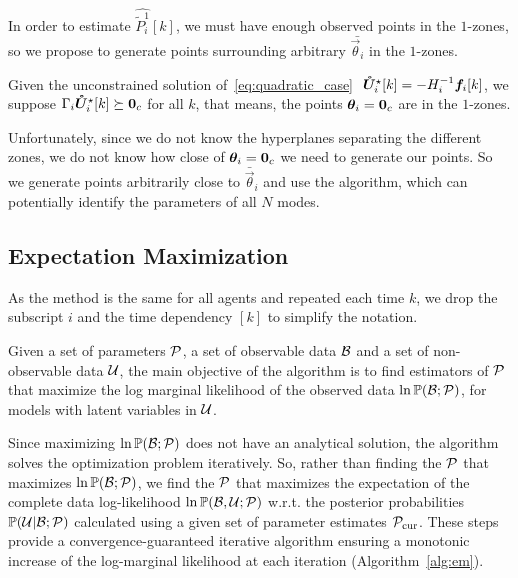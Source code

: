 \documentclass{ifacconf}  %
\begin{document}
In order to estimate $\widehat{\tilde{P}_{i}^{1}}[k]$, we must have enough observed points in the $1$-zones, so
we propose to generate points surrounding arbitrary $\bar{\vec{\theta}_{i}}$ in the $1$-zones.

\begin{assumption}\label{ass:}
  Given the unconstrained solution of~\ref{eq:quadratic_case} ${ {\optuncUik}=-H_{i}^{-1}\fik}$, we suppose
$\bar{\Gamma}_{i}\optuncUik\succeq\0_{c}$ for all $k$, that means, the points $\boldsymbol{\theta}_i=\mathbf{0}_{c}$ are in the $1$-zones.
\end{assumption}

Unfortunately, since we do not know the hyperplanes separating the different zones, we do not know how close of $\relax{\boldsymbol{\theta}}_{i}=\mathbf{0}_{c}$ we need to generate our points.
So we generate points arbitrarily close to $\bar{\vec{\theta}}_{i}$ and use the \EM{} algorithm, which can potentially identify the parameters of all $N$ modes.
\subsection{Expectation Maximization}
As the method is the same for all agents and repeated each time $k$, we drop the subscript $i$ and the time dependency $[k]$ to simplify the notation.


Given a set of parameters $\mathcal{P}$, a set of observable data $\mathcal{B}$ and a set of non-observable data $\mathcal{U}$, the main objective of the \EM{} algorithm is to find estimators of $\mathcal{P}$ that maximize the log marginal likelihood of the observed data ${\ln\mathbb{P}(\mathcal{B};\mathcal{P})}$, for models with latent variables in $\mathcal{U}$.

Since maximizing ${\ln\mathbb{P}(\mathcal{B};\mathcal{P})}$ does not have an analytical solution, the algorithm solves the optimization problem iteratively.
So, rather than finding the $\mathcal{P}$ that maximizes ${\ln\mathbb{P}(\mathcal{B};\mathcal{P})}$, we find the $\mathcal{P}$ that maximizes the expectation of the complete data log-likelihood $\ln\mathbb{P}(\mathcal{B},\mathcal{U};\mathcal{P})$ w.r.t.
the posterior probabilities ${\mathbb{P}(\mathcal{U}|\mathcal{B};\mathcal{P})}$
calculated using a given set of parameter estimates $\mathcal{P}_{\mathrm{cur}}$.
These steps provide a convergence-guaranteed iterative algorithm ensuring a monotonic increase of the log-marginal likelihood at each iteration (Algorithm~\ref{alg:em}).
\end{document}
